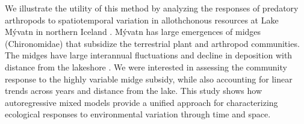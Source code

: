 We illustrate the utility of this method by analyzing the responses of predatory
arthropods to spatiotemporal variation in allothchonous resources \citep{Polis1997}
at Lake M\'{y}vatn in northern Iceland \citep{Einarsson2004}.
M\'{y}vatn has large emergences of midges
(Chironomidae) that subsidize the terrestrial plant \citep{Gratton2008}
and arthropod \citep{Dreyer2012, Sanchez2018} communities.
The midges have large interannual fluctuations \citep{Gardarsson2004}
and decline in deposition with distance from the lakeshore \citep{Dreyer2015}.
We were interested in assessing the community response to
the highly variable midge subsidy, while also accounting for linear trends across years
and distance from the lake.
This study shows how autoregressive mixed models provide a unified approach
for characterizing ecological responses to environmental variation through time and space.
